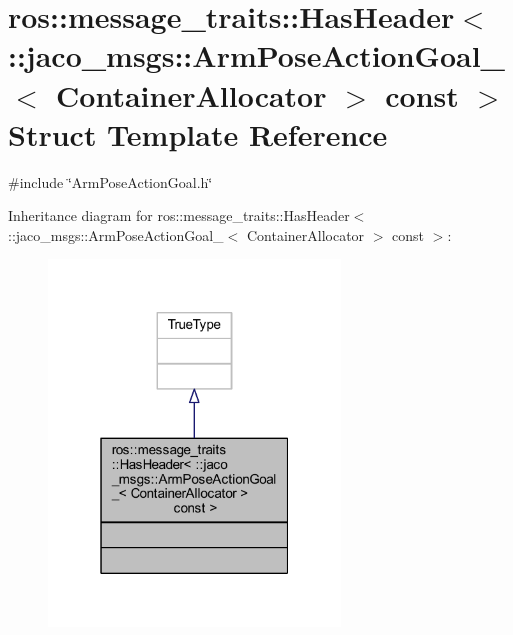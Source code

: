 \hypertarget{structros_1_1message__traits_1_1HasHeader_3_01_1_1jaco__msgs_1_1ArmPoseActionGoal___3_01ContainerAllocator_01_4_01const_01_01_4}{}\section{ros\+:\+:message\+\_\+traits\+:\+:Has\+Header$<$ \+:\+:jaco\+\_\+msgs\+:\+:Arm\+Pose\+Action\+Goal\+\_\+$<$ Container\+Allocator $>$ const $>$ Struct Template Reference}
\label{structros_1_1message__traits_1_1HasHeader_3_01_1_1jaco__msgs_1_1ArmPoseActionGoal___3_01ContainerAllocator_01_4_01const_01_01_4}


{\ttfamily \#include \char`\"{}Arm\+Pose\+Action\+Goal.\+h\char`\"{}}



Inheritance diagram for ros\+:\+:message\+\_\+traits\+:\+:Has\+Header$<$ \+:\+:jaco\+\_\+msgs\+:\+:Arm\+Pose\+Action\+Goal\+\_\+$<$ Container\+Allocator $>$ const $>$\+:
\nopagebreak
\begin{figure}[H]
\begin{center}
\leavevmode
\includegraphics[width=220pt]{df/d59/structros_1_1message__traits_1_1HasHeader_3_01_1_1jaco__msgs_1_1ArmPoseActionGoal___3_01Containe3f8a115fc6bf99ab4079386a5056a32e}
\end{center}
\end{figure}


